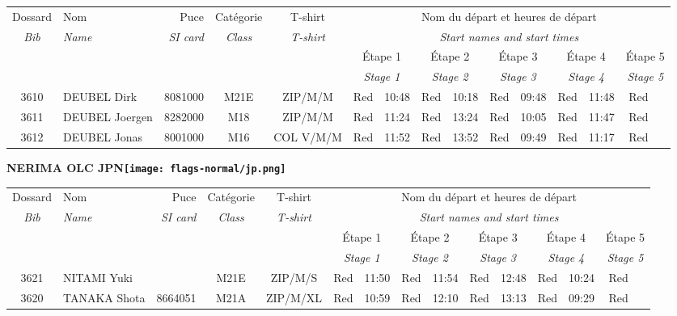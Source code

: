 \documentclass{report}
\begin{document}
  \begin{longtable}{|c|l|r|c|c|*{5}{cc|}}
    Dossard & Nom  & Puce    & Catégorie & T-shirt & \multicolumn{10}{c|}{Nom du départ et heures de départ} \\
    \itshape Bib     & \itshape Name & \itshape SI card & \itshape Class  & \itshape  T-shirt  & \multicolumn{10}{c|}{\itshape Start names and start times} \\
    \hline
    & & & & & \multicolumn{2}{c|}{Étape 1} & \multicolumn{2}{c|}{Étape 2} & \multicolumn{2}{c|}{Étape 3} & \multicolumn{2}{c|}{Étape 4} & \multicolumn{2}{c|}{Étape 5} \\
    & & & & & \multicolumn{2}{c|}{\itshape Stage 1} & \multicolumn{2}{c|}{\itshape Stage 2} & \multicolumn{2}{c|}{\itshape Stage 3} & \multicolumn{2}{c|}{\itshape Stage 4} & \multicolumn{2}{c|}{\itshape Stage 5} \\
    \hline
    3610 & DEUBEL Dirk & 8081000 & M21E & ZIP/M/M & Red & 10:48 & Red & 10:18 & Red & 09:48 & Red & 11:48 & Red &  \\
    3611 & DEUBEL Joergen & 8282000 & M18 & ZIP/M/M & Red & 11:24 & Red & 13:24 & Red & 10:05 & Red & 11:47 & Red &  \\
    3612 & DEUBEL Jonas & 8001000 & M16 & COL V/M/M & Red & 11:52 & Red & 13:52 & Red & 09:49 & Red & 11:17 & Red &  \\
  \end{longtable}
\newpage
  \Huge \centering \bfseries NERIMA OLC  JPN\normalfont \footnotesize \sffamily \hfill \texttt{[image: flags-normal/jp.png]} \newline 
  \begin{longtable}{|c|l|r|c|c|*{5}{cc|}}
    Dossard & Nom  & Puce    & Catégorie & T-shirt & \multicolumn{10}{c|}{Nom du départ et heures de départ} \\
    \itshape Bib     & \itshape Name & \itshape SI card & \itshape Class  & \itshape  T-shirt  & \multicolumn{10}{c|}{\itshape Start names and start times} \\
    \hline
    & & & & & \multicolumn{2}{c|}{Étape 1} & \multicolumn{2}{c|}{Étape 2} & \multicolumn{2}{c|}{Étape 3} & \multicolumn{2}{c|}{Étape 4} & \multicolumn{2}{c|}{Étape 5} \\
    & & & & & \multicolumn{2}{c|}{\itshape Stage 1} & \multicolumn{2}{c|}{\itshape Stage 2} & \multicolumn{2}{c|}{\itshape Stage 3} & \multicolumn{2}{c|}{\itshape Stage 4} & \multicolumn{2}{c|}{\itshape Stage 5} \\
    \hline
    3621 & NITAMI Yuki &  & M21E & ZIP/M/S & Red & 11:50 & Red & 11:54 & Red & 12:48 & Red & 10:24 & Red &  \\
    3620 & TANAKA Shota & 8664051 & M21A & ZIP/M/XL & Red & 10:59 & Red & 12:10 & Red & 13:13 & Red & 09:29 & Red &  \\
  \end{longtable}
\end{document}
